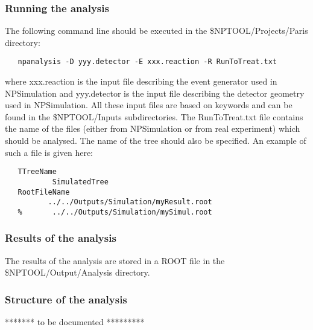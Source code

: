 \documentclass[a4paper,12pt]{article}
\begin{document}
\subsubsection{Running the analysis}
The following command line should be executed in the 
\$NPTOOL/Projects/Paris directory:

\begin{verbatim}
   npanalysis -D yyy.detector -E xxx.reaction -R RunToTreat.txt
\end{verbatim}

where xxx.reaction is the input file describing the event generator used in 
NPSimulation and yyy.detector is the input file describing the detector geometry
used in NPSimulation. All these input files are based on keywords and can be found 
in the \$NPTOOL/Inputs subdirectories. The RunToTreat.txt file contains the
name of the files (either from NPSimulation or from real experiment) which should
be analysed. The name of the tree should also be specified. An example 
of such a file is given here:

\begin{verbatim}
   TTreeName
           SimulatedTree
   RootFileName
          ../../Outputs/Simulation/myResult.root
   %       ../../Outputs/Simulation/mySimul.root
\end{verbatim}


\subsubsection{Results of the analysis}
The results of the analysis are stored in a ROOT file in the \$NPTOOL/Output/Analysis
directory.


\subsubsection{Structure of the analysis}
******* to be documented *********
\end{document}
